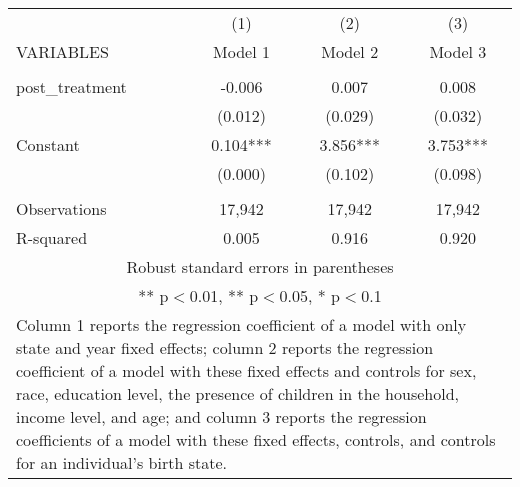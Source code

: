 \begin{tabular}{lccc}
\hline
 & (1) & (2) & (3) \\
VARIABLES & Model 1 & Model 2 & Model 3 \\ \hline
 &  &  &  \\
post\_treatment & -0.006 & 0.007 & 0.008 \\
 & (0.012) & (0.029) & (0.032) \\
Constant & 0.104*** & 3.856*** & 3.753*** \\
 & (0.000) & (0.102) & (0.098) \\
 &  &  &  \\
Observations & 17,942 & 17,942 & 17,942 \\
 R-squared & 0.005 & 0.916 & 0.920 \\ \hline
\multicolumn{4}{c}{\small Robust standard errors in parentheses} \\
\multicolumn{4}{c}{\small *** p$<$0.01, ** p$<$0.05, * p$<$0.1} \\
\multicolumn{4}{p{0.8\linewidth}}{\small Column 1 reports the
regression coefficient of a model with only state and year fixed effects; column 2 reports the
regression coefficient of a model with these fixed effects and controls for sex, race, education
level, the presence of children in the household, income level, and age; and column 3 reports
the regression coefficients of a model with these fixed effects, controls, and controls for an
individual’s birth state.} \\
\end{tabular}
